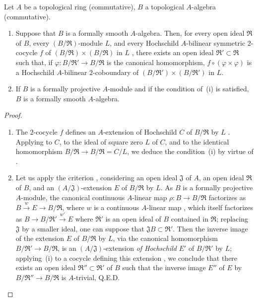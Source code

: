 \begin{corollary}[19.4.5]
\label{0.19.4.5}
Let $A$ be a topological ring (commutative), $B$ a topological $A$-algebra (commutative).
\begin{enumerate}
  \item[\rm(i)] Suppose that $B$ is a formally smooth $A$-algebra. Then, for every open ideal $\mathfrak{R}$ of $B$, every $(B/\mathfrak{R})$-module $L$, and every Hochschild $A$-bilinear symmetric $2$-cocycle $f$ of $(B/\mathfrak{R})\times(B/\mathfrak{R})$ in $L$ , there exists an open ideal $\mathfrak{R}'\subset\mathfrak{R}$ such that, if $\varphi:B/\mathfrak{R}'\to B/\mathfrak{R}$ is the canonical homomorphism, $f\circ(\varphi\times\varphi)$ is a Hochschild $A$-bilinear $2$-coboundary of $(B/\mathfrak{R}')\times(B/\mathfrak{R}')$ in $L$.
  \item[\rm(ii)] If $B$ is a formally projective $A$-module  and if the condition of~{\rm(i)} is satisfied, $B$ is a formally smooth $A$-algebra.
\end{enumerate}
\end{corollary}

\begin{proof}
\begin{enumerate}
  \item[\rm(i)] The $2$-cocycle $f$ defines an $A$-extension of Hochschild $C$ of $B/\mathfrak{R}$ by $L$ .
  Applying  to $C$, to the ideal of square zero $L$ of $C$, and to the identical homomorphism $B/\mathfrak{R}\to B/\mathfrak{R}=C/L$, we deduce the condition~(i) by virtue of .

  \item[\rm(ii)] Let us apply the criterion , considering an open ideal $\mathfrak{J}$ of $A$, an open ideal $\mathfrak{R}$ of $B$, and an $(A/\mathfrak{J})$-extension $E$ of $B/\mathfrak{R}$ by $L$.
  As $B$ is a formally projective $A$-module, the canonical continuous $A$-linear map $\rho:B\to B/\mathfrak{R}$ factorizes as $B\xrightarrow{w}E\to B/\mathfrak{R}$, where $w$ is a continuous $A$-linear map ,
  which itself factorizes as $B\to B/\mathfrak{R}'\xrightarrow{w'}E$ where $\mathfrak{R}'$ is an open ideal of $B$ contained in $\mathfrak{R}$;
  replacing $\mathfrak{J}$ by a smaller ideal, one can suppose that $\mathfrak{J}B\subset\mathfrak{R}'$.
  Then the inverse image of the extension $E$ of $B/\mathfrak{R}$ by $L$, via the canonical homomorphism $B/\mathfrak{R}'\to B/\mathfrak{R}$, is an $(A/\mathfrak{J})$-extension \emph{of Hochschild} $E'$ of $B/\mathfrak{R}'$ by $L$;
  applying~(i) to a cocycle defining this extension , we conclude that there exists an open ideal $\mathfrak{R}''\subset\mathfrak{R}'$ of $B$ such that the inverse image $E''$ of $E$ by $B/\mathfrak{R}''\to B/\mathfrak{R}$ is $A$-trivial, Q.E.D.
\end{enumerate}
\end{proof}

